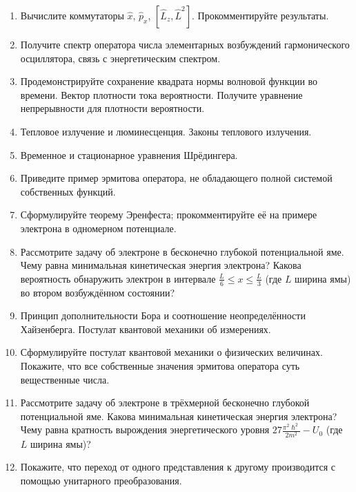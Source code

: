 \documentclass[12pt]{article}
\begin{document}
\begin{enumerate}
\item\label{_36}
Вычислите коммутаторы $\hat{x}$, $\hat{p}_x$, $\left[\hat{L}_z,\hat{L}^2\right]$. Прокомментируйте результаты.

\item\label{_37}
Получите спектр оператора числа элементарных возбуждений гармонического осциллятора, связь с энергетическим спектром.

\item\label{_38}
Продемонстрируйте сохранение квадрата нормы волновой функции во времени. Вектор плотности тока вероятности. Получите уравнение непрерывности для плотности вероятности.

\item\label{_39}
Тепловое излучение и люминесценция. Законы теплового излучения.

\item\label{_40}
Временное и стационарное уравнения Шрёдингера.

\item\label{_41}
Приведите пример эрмитова оператора, не обладающего полной системой собственных функций.

\item\label{_42}
Сформулируйте теорему Эренфеста; прокомментируйте её на примере электрона в одномерном потенциале.

\item\label{_43}
Рассмотрите задачу об электроне в бесконечно глубокой потенциальной яме. Чему равна минимальная кинетическая энергия электрона? Какова вероятность обнаружить электрон в интервале $\frac{L}{6}\le x\le \frac{L}{3}$ (где $L$ ширина ямы) во втором возбуждённом состоянии?

\item\label{_44}
Принцип дополнительности Бора и соотношение неопределённости Хайзенберга. Постулат квантовой механики об измерениях.

\item\label{_45}
Сформулируйте постулат квантовой механики о физических величинах. Покажите, что все собственные значения эрмитова оператора суть вещественные числа.

\item\label{_46}
Рассмотрите задачу об электроне в трёхмерной бесконечно глубокой потенциальной яме. Какова минимальная кинетическая энергия электрона? Чему равна кратность вырождения энергетического уровня $ 27 \frac{\pi^2\hslash^2}{2m^2}-U_0$ (где $L$ ширина ямы)?

\item\label{_47}
Покажите, что переход от одного представления к другому производится с помощью унитарного преобразования.


\end{enumerate}
\end{document}
